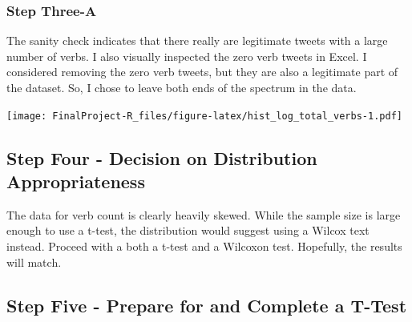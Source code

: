 \documentclass[]{article}
\newenvironment{Shaded}{\begin{snugshade}}{\end{snugshade}}
\newcommand{\KeywordTok}[1]{\textcolor[rgb]{0.13,0.29,0.53}{\textbf{#1}}}
\newcommand{\DataTypeTok}[1]{\textcolor[rgb]{0.13,0.29,0.53}{#1}}
\newcommand{\DecValTok}[1]{\textcolor[rgb]{0.00,0.00,0.81}{#1}}
\newcommand{\StringTok}[1]{\textcolor[rgb]{0.31,0.60,0.02}{#1}}
\newcommand{\CommentTok}[1]{\textcolor[rgb]{0.56,0.35,0.01}{\textit{#1}}}
\newcommand{\OperatorTok}[1]{\textcolor[rgb]{0.81,0.36,0.00}{\textbf{#1}}}
\newcommand{\NormalTok}[1]{#1}
\begin{document}
\subsubsection{Step Three-A}\label{step-three-a}

The sanity check indicates that there really are legitimate tweets with
a large number of verbs. I also visually inspected the zero verb tweets
in Excel. I considered removing the zero verb tweets, but they are also
a legitimate part of the dataset. So, I chose to leave both ends of the
spectrum in the data.

\begin{Shaded}
\end{Shaded}

\texttt{[image: FinalProject-R\_files/figure-latex/hist\_log\_total\_verbs-1.pdf]}

\subsection{Step Four - Decision on Distribution
Appropriateness}\label{step-four---decision-on-distribution-appropriateness}

The data for verb count is clearly heavily skewed. While the sample size
is large enough to use a t-test, the distribution would suggest using a
Wilcox text instead. Proceed with a both a t-test and a Wilcoxon test.
Hopefully, the results will match.

\subsection{Step Five - Prepare for and Complete a
T-Test}\label{step-five---prepare-for-and-complete-a-t-test}
\end{document}
